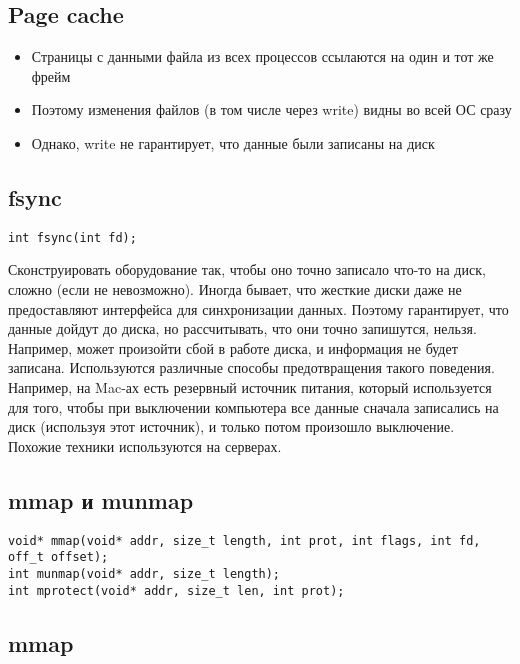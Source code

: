     \subsection{Page cache}
      \begin{itemize}
        \item Страницы с данными файла из всех процессов ссылаются на один и тот же фрейм
        \item Поэтому изменения файлов (в том числе через write) видны во всей ОС сразу
        \item Однако, write не гарантирует, что данные были записаны на диск
      \end{itemize}
    
    \subsection{fsync}
\begin{lstlisting}[style=cpp]
int fsync(int fd);
\end{lstlisting}
Сконструировать оборудование так, чтобы оно точно записало что-то на диск, сложно (если не невозможно). Иногда бывает, что жесткие диски даже не предоставляют интерфейса для синхронизации данных. Поэтому  гарантирует, что данные дойдут до диска, но рассчитывать, что они точно запишутся, нельзя. Например, может произойти сбой в работе диска, и информация не будет записана. Используются различные способы предотвращения такого поведения. Например, на Mac-ах есть резервный источник питания, который используется для того, чтобы при выключении компьютера все данные сначала записались на диск (используя этот источник), и только потом произошло выключение. Похожие техники используются на серверах.

    \subsection{mmap и munmap}
\begin{lstlisting}[style=cpp]
void* mmap(void* addr, size_t length, int prot, int flags, int fd, off_t offset);
int munmap(void* addr, size_t length);
int mprotect(void* addr, size_t len, int prot);
\end{lstlisting}

    \subsection{mmap}
    
